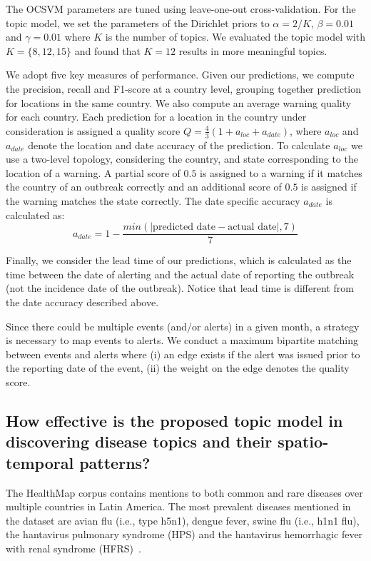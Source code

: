 \documentclass[twoside,leqno,twocolumn]{article}
\begin{document}
 The OCSVM parameters are tuned using leave-one-out cross-validation. For the topic model, we set the parameters of the Dirichlet priors to $\alpha = 2/K$, $\beta = 0.01$ and $\gamma = 0.01$ where $K$ is the number of topics. We evaluated the topic model with $K = \{8, 12, 15\}$ and found that $K=12$ results in more meaningful topics.  


 We adopt five key measures of performance. Given our predictions, we compute the precision, recall and F1-score at a country level, grouping together prediction for locations in the same country. We also compute an average warning quality for each country. Each prediction for a location in the country under consideration is assigned a quality score $Q = \frac{4}{3}(1 + a_{loc} + a_{date})$, where $a_{loc}$ and $a_{date}$ denote the location and date accuracy of the prediction. To calculate $a_{loc}$ we use a two-level topology, considering the country, and state corresponding to the location of a warning. A partial score of $0.5$ is assigned to a warning if it matches the country of an outbreak correctly and an additional score of $0.5$ is assigned if the warning matches the state correctly. The date specific accuracy $a_{date}$ is calculated as: 
{\small \begin{equation} 
a_{date} = 1 - \frac{min(|\mbox{predicted date} - \mbox{actual date}|,7)}{7}
\end{equation}}\vspace{-5pt}

\noindent Finally, we consider the lead time of our predictions, which is calculated as the time between the date of alerting and the actual date of reporting the outbreak (not the incidence date of the outbreak). Notice that lead time is different from the date accuracy described above.  

 Since there could be multiple events (and/or alerts) in a given month, a strategy is necessary to map events to alerts. We conduct a maximum bipartite matching between events and alerts where (i) an edge exists if the alert was issued prior to the reporting date of the event, (ii) the weight on the edge denotes the quality score. 
\vspace{-10pt}
\subsection{How effective is the proposed topic model in discovering disease topics and their spatio-temporal patterns?} The HealthMap corpus contains mentions to both common and rare diseases over multiple countries in Latin America. The most prevalent diseases mentioned in the dataset are avian flu (i.e., type h5n1), dengue fever, swine flu (i.e., h1n1 flu), the hantavirus pulmonary syndrome (HPS) and the hantavirus hemorrhagic fever with renal syndrome (HFRS)~\cite{jonsson:10}. 
\end{document}
